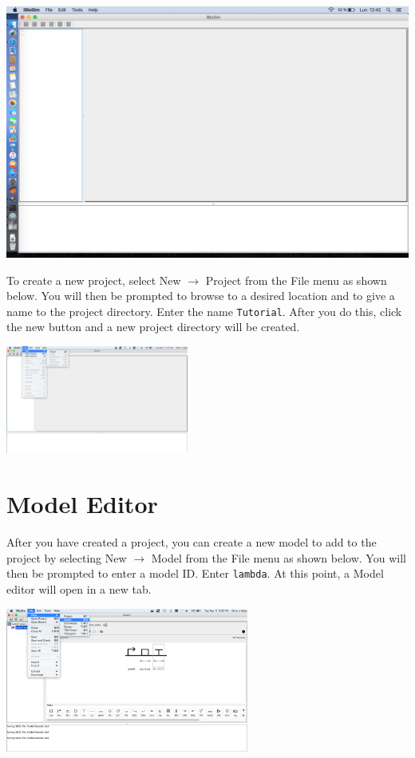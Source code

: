 \documentclass[titlepage,11pt]{article}
\begin{document}
\begin{center}
\includegraphics[width=160mm]{screenshots/iBioSim}
\end{center}

\noindent
To create a new project, select New $\rightarrow$ Project from the File menu as shown below.  You will then be prompted to browse to a desired location and to give a name to the project directory.  Enter the name {\tt Tutorial}.  After you do this, click the new button and a new project directory will be created.  

\begin{center}
\includegraphics[width=60mm]{screenshots/project}
\end{center}

\section{Model Editor}

\noindent
After you have created a project, you can create a new model to add to the project by selecting New $\rightarrow$ Model from the File menu as shown below. You will then be prompted to enter a model ID.  Enter {\tt lambda}.  At this point, a Model editor will open in a new tab.

\begin{center}
\includegraphics[width=80mm]{screenshots/newModel}
\end{center}
\end{document}
